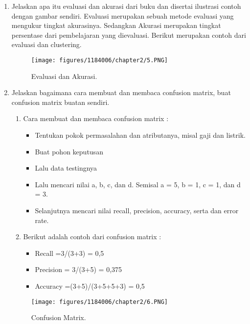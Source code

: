 \begin{enumerate}
	\item Jelaskan apa itu evaluasi dan akurasi dari buku dan disertai ilustrasi contoh dengan gambar sendiri.
	\hfill\break
	Evaluasi merupakan sebuah metode evaluasi yang mengukur tingkat akurasinya. Sedangkan Akurasi merupakan tingkat persentase dari pembelajaran yang dievaluasi. Berikut merupakan contoh dari  evaluasi dan clustering.
	\begin{figure}[h]
	\centering
		\texttt{[image: figures/1184006/chapter2/5.PNG]}
		\caption{Evaluasi dan Akurasi.}
	\end{figure}

	\item Jelaskan bagaimana cara membuat dan membaca confusion matrix, buat confusion matrix buatan sendiri.
	\hfill\break
	\begin{enumerate}
	\item Cara membuat dan membaca confusion matrix :
	\begin{itemize}
	\item Tentukan pokok permasalahan dan atributanya, misal gaji dan listrik.
	\item Buat pohon keputusan
	\item Lalu data testingnya
	\item Lalu mencari nilai a, b, c, dan d. Semisal a = 5, b = 1, c = 1, dan d = 3.
	\item Selanjutnya mencari nilai recall, precision, accuracy, serta dan error rate.
	\end{itemize}
	\item Berikut adalah contoh dari confusion matrix :
	\begin{itemize}
	\item Recall =3/(3+3) = 0,5
	\item Precision = 3/(3+5) = 0,375
	\item Accuracy =(3+5)/(3+5+5+3) = 0,5
	\end{itemize}
	\end{enumerate}

	\begin{figure}[h]
	\centering
		\texttt{[image: figures/1184006/chapter2/6.PNG]}
		\caption{Confusion Matrix.}
	\end{figure}


\end{enumerate}
